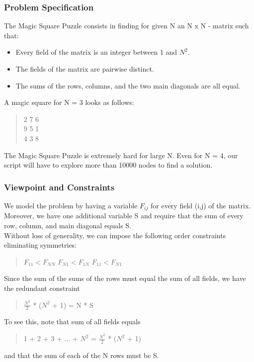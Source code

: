 \documentclass[a4paper]{scrartcl}
\begin{document}
\subsubsection{Problem Specification}
The Magic Square Puzzle consists in finding for given N
an N x N  - matrix such that:
\begin{itemize} 
\item
Every field of the matrix is an integer between 1 and $N^2$.
\item
The fields of the matrix are pairwise distinct.
\item
The sums of the rows, columns, and the two main diagonals
 are all equal.
\end{itemize}
A magic square for N = 3 looks as follows:
\begin{quote}
2 \hspace{4mm} 7 \hspace{4mm}6\\
9 \hspace{4mm} 5 \hspace{4mm}1\\
4 \hspace{4mm} 3 \hspace{4mm}8
\end{quote}
The Magic Square Puzzle is extremely hard for large N. 
Even for N = 4, our script will have to explore more 
than 10000 
nodes to find a solution. 

\subsubsection{Viewpoint and Constraints}
We model the problem by having a variable $F_{ij}$ for every field 
(i,j) of the matrix. Moreover, we have one additional variable S 
and require that the sum of every row, column, and main diagonal 
equals S.\\

Without loss of generality, we can impose the following order 
constraints eliminating symmetries: 
\begin{quote}
$F_{11} < F_{NN}$ \hspace{4mm}$F_{N1} < F_{1N}$ \hspace{4mm}$F_{11} < F_{N1}$
\end{quote}
Since the sum of the sums of the rows must equal the sum of all 
fields, we have the redundant constraint
\begin{quote}
$\frac{N^2}{2}$ * ($N^2$ + 1) = N * S
\end{quote} 
To see this, note that sum of all fields equals 
\begin{quote}
1 + 2 + 3 + $\ldots$ + $N^2$ = $\frac{N^2}{2}$ * ($N^2$ + 1)
\end{quote}
and that the sum of each of the N rows must be S. 
\end{document}

